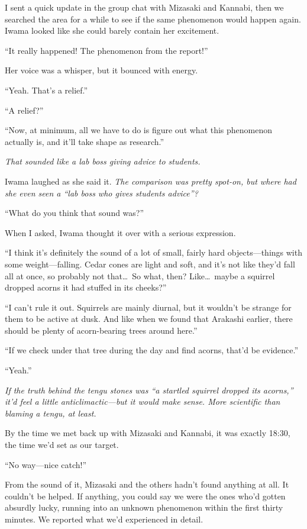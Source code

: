 \documentclass[
    a4paper,
    12pt,
    twoside,
    openany,
    UTF8,
    fontset=windows
]{ctexbook}
\begin{document}
I sent a quick update in the group chat with Mizasaki and Kannabi, then we searched the area for a while to see if the same phenomenon would happen again. Iwama looked like she could barely contain her excitement.

``It really happened! The phenomenon from the report!''

Her voice was a whisper, but it bounced with energy.

``Yeah. That's a relief.''

``A relief?''

``Now, at minimum, all we have to do is figure out what this phenomenon actually is, and it'll take shape as research.''

\textit{That sounded like a lab boss giving advice to students.}

Iwama laughed as she said it. \textit{The comparison was pretty spot-on, but where had she even seen a ``lab boss who gives students advice''?}

``What do you think that sound was?''

When I asked, Iwama thought it over with a serious expression.

``I think it's definitely the sound of a lot of small, fairly hard objects---things with some weight---falling. Cedar cones are light and soft, and it's not like they'd fall all at once, so probably not that\dots\ So what, then? Like\dots\ maybe a squirrel dropped acorns it had stuffed in its cheeks?''

``I can't rule it out. Squirrels are mainly diurnal, but it wouldn't be strange for them to be active at dusk. And like when we found that Arakashi earlier, there should be plenty of acorn-bearing trees around here.''

``If we check under that tree during the day and find acorns, that'd be evidence.''

``Yeah.''

\textit{If the truth behind the tengu stones was ``a startled squirrel dropped its acorns,'' it'd feel a little anticlimactic---but it would make sense. More scientific than blaming a tengu, at least.}

By the time we met back up with Mizasaki and Kannabi, it was exactly 18:30, the time we'd set as our target.

``No way---nice catch!''

From the sound of it, Mizasaki and the others hadn't found anything at all. It couldn't be helped. If anything, you could say we were the ones who'd gotten absurdly lucky, running into an unknown phenomenon within the first thirty minutes. We reported what we'd experienced in detail.
\end{document}
